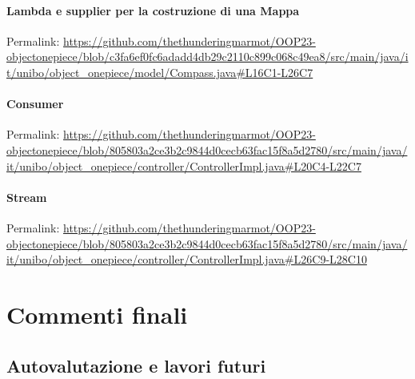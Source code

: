 \documentclass[a4paper,12pt]{report}
\begin{document}
\subsubsection{Lambda e supplier per la costruzione di una Mappa}
Permalink: \url{https://github.com/thethunderingmarmot/OOP23-objectonepiece/blob/c3fa6ef0fc6adadd4db29c2110c899c068c49ea8/src/main/java/it/unibo/object_onepiece/model/Compass.java#L16C1-L26C7}

\subsubsection{Consumer}
Permalink: \url{https://github.com/thethunderingmarmot/OOP23-objectonepiece/blob/805803a2ce3b2c9844d0cecb63fac15f8a5d2780/src/main/java/it/unibo/object_onepiece/controller/ControllerImpl.java#L20C4-L22C7}

\subsubsection{Stream}
Permalink: \url{https://github.com/thethunderingmarmot/OOP23-objectonepiece/blob/805803a2ce3b2c9844d0cecb63fac15f8a5d2780/src/main/java/it/unibo/object_onepiece/controller/ControllerImpl.java#L26C9-L28C10}	


\chapter{Commenti finali}

\section{Autovalutazione e lavori futuri}
\end{document}

